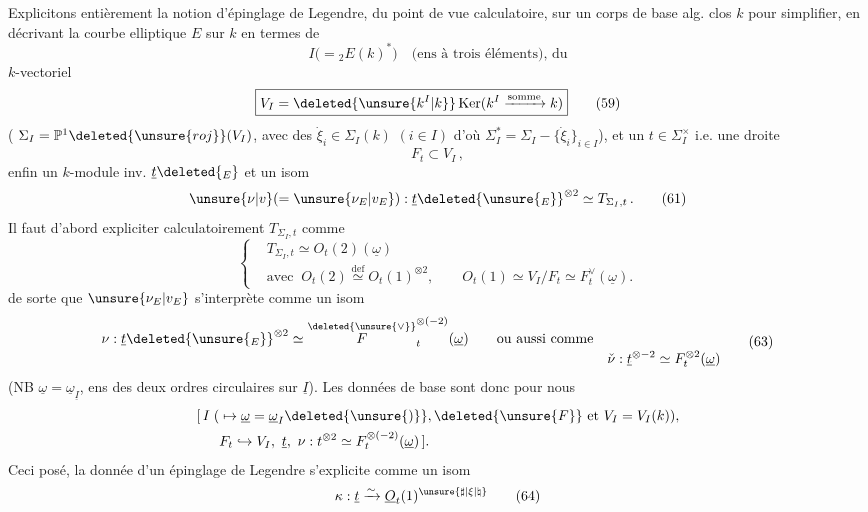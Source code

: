 Explicitons entièrement la notion d'épinglage de Legendre, du point de vue calculatoire, sur un corps de base alg. clos $k$ pour simplifier, en décrivant la courbe elliptique $E$ sur $k$ en termes de
\[
\boxed{I\bigl(={}_2E(k)^*\bigr)}\quad\text{(ens à trois éléments), du} \tag*{(58)}
\]
$k$-vectoriel
\[
\boxed{V_I=\deleted{\unsure{k^I|k}}\operatorname{Ker}(k^I\xrightarrow{\text{somme}}k)} \tag*{(59)}
\]
( $\Sigma_I=\mathbb P^1\deleted{\unsure{roj}}(V_I)$, avec  des $\dot\xi_i\in\Sigma_I(k)$ $(i\in I)$ d'où $\Sigma_I^*=\Sigma_I-\{\dot\xi_i\}_{i\in I}$), et un $t\in\Sigma_I^\times$ i.e. une droite
\[
F_t\subset V_I\,, \tag*{(60)}
\]
enfin un $k$-module inv. $\underline t\deleted{_E}$  et un isom
\[
\unsure{\nu|v}(=\unsure{\nu_E|v_E}):\underline t\deleted{\unsure{_E}}^{\otimes2}\simeq T_{\Sigma_I,t}\,. \tag*{(61)}
\]
Il faut d'abord expliciter calculatoirement $T_{\Sigma_I,t}$
comme
\[
\left\{\begin{aligned}
&T_{\Sigma_I,t}\simeq O_t(2)(\underline\omega)\\
&\text{avec }\ O_t(2)\overset{\mathrm{def}}{\simeq}O_t(1)^{\otimes2},\qquad
O_t(1)\simeq V_I/F_t\simeq F_t^\vee(\underline\omega).
\end{aligned}\right. \tag*{(62)}
\]
de sorte que $\unsure{\nu_E|v_E}$ s'interprète comme un isom
\[
\begin{aligned}
\nu:\underline t\deleted{\unsure{_E}}^{\otimes2}&\simeq
\overset{\deleted{\unsure{\vee}}}{F}_t^{\otimes(-2)}(\underline\omega)
\qquad\text{ou aussi comme}\\[-2pt]
&&\check\nu:\underline t^{\otimes-2}\simeq F_t^{\otimes2}(\underline\omega)
\end{aligned}\tag*{(63)}
\]
(NB $\underline\omega=\underline\omega_{\underline I}$, ens des deux ordres circulaires sur $\underline I$). Les données de base sont donc pour nous
\[
\begin{aligned}
[\,I\;(&\mapsto\underline\omega=\underline\omega_I\deleted{\unsure{)}},\deleted{\unsure{F}}\text{ et }V_I=V_I(k)),\\
&F_t\hookrightarrow V_I,\ \underline t,\ \nu:t^{\otimes2}\simeq F_t^{\otimes(-2)}(\underline\omega)\,].
\end{aligned}
\]
Ceci posé, la donnée d'un épinglage de Legendre s'explicite comme un isom
\[
\kappa:\underline t\xrightarrow{\sim}\underline O_t(1)^{\unsure{\sharp|\xi|\natural}} \tag*{(64)}
\]
